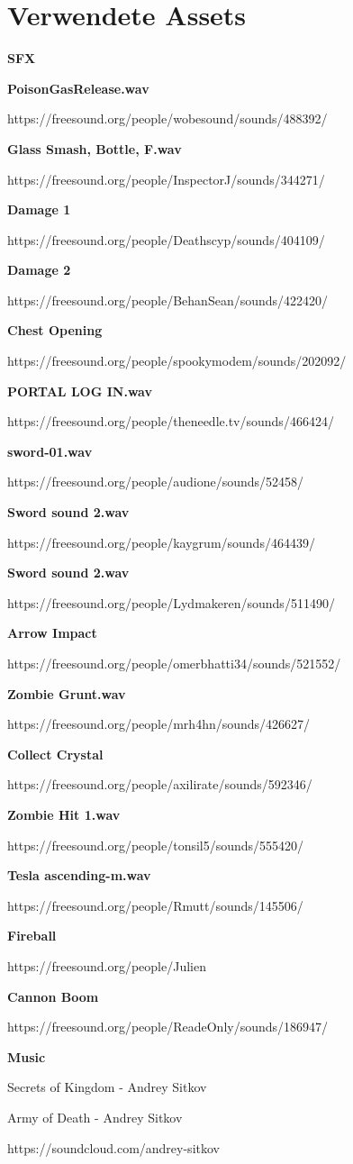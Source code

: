\section{Verwendete Assets}

\textbf{SFX}


\textbf{PoisonGasRelease.wav}

https://freesound.org/people/wobesound/sounds/488392/

\textbf{Glass Smash, Bottle, F.wav}

https://freesound.org/people/InspectorJ/sounds/344271/

\textbf{Damage 1}

https://freesound.org/people/Deathscyp/sounds/404109/

\textbf{Damage 2}

https://freesound.org/people/BehanSean/sounds/422420/

\textbf{Chest Opening}

https://freesound.org/people/spookymodem/sounds/202092/

\textbf{PORTAL LOG IN.wav}

https://freesound.org/people/theneedle.tv/sounds/466424/

\textbf{sword-01.wav}

https://freesound.org/people/audione/sounds/52458/

\textbf{Sword sound 2.wav}

https://freesound.org/people/kaygrum/sounds/464439/

\textbf{Sword sound 2.wav}

https://freesound.org/people/Lydmakeren/sounds/511490/

\textbf{Arrow Impact}

https://freesound.org/people/omerbhatti34/sounds/521552/

\textbf{Zombie Grunt.wav}

https://freesound.org/people/mrh4hn/sounds/426627/

\textbf{Collect Crystal}

https://freesound.org/people/axilirate/sounds/592346/

\textbf{Zombie Hit 1.wav}

https://freesound.org/people/tonsil5/sounds/555420/

\textbf{Tesla ascending-m.wav}

https://freesound.org/people/Rmutt/sounds/145506/

\textbf{Fireball}

https://freesound.org/people/Julien%

\textbf{Cannon Boom}

https://freesound.org/people/ReadeOnly/sounds/186947/

\textbf{Music}

Secrets of Kingdom - Andrey Sitkov

Army of Death - Andrey Sitkov 

https://soundcloud.com/andrey-sitkov


